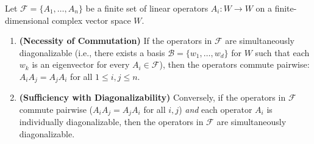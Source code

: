 \begin{theorem}
\label{thm:simultaneous_diag}
Let $\mathcal{F} = \{A_1, \dots, A_n\}$ be a finite set of linear operators $A_i: W \to W$ on a finite-dimensional complex vector space $W$.
\begin{enumerate}
    \item \textbf{(Necessity of Commutation)} If the operators in $\mathcal{F}$ are simultaneously diagonalizable (i.e., there exists a basis $\mathcal{B} = \{w_1, \dots, w_d\}$ for $W$ such that each $w_k$ is an eigenvector for every $A_i \in \mathcal{F}$), then the operators commute pairwise: $A_i A_j = A_j A_i$ for all $1 \le i, j \le n$.
    \item \textbf{(Sufficiency with Diagonalizability)} Conversely, if the operators in $\mathcal{F}$ commute pairwise ($A_i A_j = A_j A_i$ for all $i, j$) \textit{and} each operator $A_i$ is individually diagonalizable, then the operators in $\mathcal{F}$ are simultaneously diagonalizable.
\end{enumerate}
\end{theorem}
